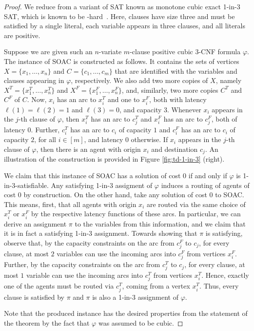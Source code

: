 \documentclass[letterpaper]{article} %
\newcommand{\problem}{{\sc SOAC}\xspace} %
\begin{document}
\begin{proof}
We reduce from a variant of SAT known as monotone cubic exact 1-in-3 SAT, which is known to be \NP-hard~\cite{PorschenSSW14,Schmidt2010d}.
Here, clauses have size three and must be satisfied by a single literal, each variable appears in three clauses, and all literals are positive.

Suppose we are given such an $n$-variate $m$-clause positive cubic $3$-CNF formula $\varphi$.
The instance of \problem is constructed as follows.
It contains the sets of vertices $X = \{x_1,\ldots,x_n\}$ and $C = \{c_1,\ldots,c_m\}$ that are identified with the variables and clauses appearing in $\varphi$, respectively.
We also add two more copies of $X$, namely $X^T = \{x^T_1,\ldots,x^T_n\}$ and $X^F = \{x^F_1,\ldots,x^F_n\}$, and, similarly, two more copies $C^T$ and $C^F$ of $C$. 
Now, $x_i$ has an arc to $x^T_i$ and one to $x^F_i$, both with latency $\ell(1) = \ell(2) = 1$ and $\ell(3) = 0$, and capacity $3$.
Whenever $x_i$ appears in the $j$-th clause of $\varphi$, then $x^T_i$ has an arc to $c^T_j$ and $x^F_i$ has an arc to $c^F_j$, both of latency $0$.
Further, $c^T_i$ has an arc to $c_i$ of capacity $1$ and $c^F_i$ has an arc to $c_i$ of capacity $2$, for all $i \in [m]$, and latency $0$ otherwise.
If $x_i$ appears in the $j$-th clause of $\varphi$, then there is an agent with origin $x_i$ and destination $c_j$. An illustration of the construction is provided in Figure \ref{fig:td-1-in-3} (right).

We claim that this instance of \problem{} has a solution of cost $0$ if and only if $\varphi$ is 1-in-3-satisfiable.
Any satisfying 1-in-3 assigment of $\varphi$ induces a routing of agents of cost $0$ by construction.
On the other hand, take any solution of cost $0$ to \problem.
This means, first, that all agents with origin $x_i$ are routed via the same choice of $x_i^T$ or $x_i^F$ by the respective latency functions of these arcs. In particular, we can derive an assignment $\pi$ to the variables from this information, and we claim that it is in fact a satisfying 1-in-3 assignment.
Towards showing that $\pi$ is satisfying, observe that, by the capacity constraints on the arc from $c^F_j$ to $c_j$, for every clause, at most $2$ variables can use the incoming arcs into $c^F_j$ from vertices $x^F_i$. Further, by the capacity constraints on the arc from $c^T_j$ to $c_j$, for every clause, at most $1$ variable can use the incoming arcs into $c^T_j$ from vertices $x^T_i$. Hence, exactly one of the agents must be routed via $c^T_j$, coming from a vertex $x^T_i$. Thus, every clause is satisfied by $\pi$ and $\pi$ is also a 1-in-3 assignment of $\varphi$.

Note that the produced instance has the desired properties from the statement of the theorem by the fact that $\varphi$ was assumed to be cubic.
\end{proof}
\end{document}
